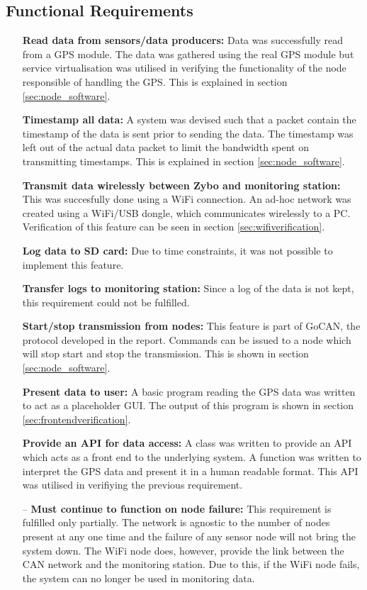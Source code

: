 \subsection{Functional Requirements}
\begin{itemize}
	\item[\cmark] \textbf{Read data from sensors/data producers:}
	Data was successfully read from a GPS module.
	The data was gathered using the real GPS module but service virtualisation was utilised in verifying the functionality of the node responsible of handling the GPS.
	This is explained in section \ref{sec:node_software}.
	\item[\cmark] \textbf{Timestamp all data:}
	A system was devised such that a packet contain the timestamp of the data is sent prior to sending the data.
	The timestamp was left out of the actual data packet to limit the bandwidth spent on transmitting timestamps.
	This is explained in section \ref{sec:node_software}.
	\item[\cmark] \textbf{Transmit data wirelessly between Zybo and monitoring station:}
	This was succesfully done using a WiFi connection.
	An ad-hoc network was created using a WiFi/USB dongle, which communicates wirelessly to a PC.
	Verification of this feature can be seen in section \ref{sec:wifiverification}.
	\item[\xmark] \textbf{Log data to SD card:}
	Due to time constraints, it was not possible to implement this feature.
	\item[\xmark] \textbf{Transfer logs to monitoring station:}
	Since a log of the data is not kept, this requirement could not be fulfilled.
	\item[\cmark] \textbf{Start/stop transmission from nodes:}
	This feature is part of GoCAN, the protocol developed in the report.
	Commands can be issued to a node which will stop start and stop the transmission.
	This is shown in section \ref{sec:node_software}.
	\item[\cmark] \textbf{Present data to user:}
	A basic program reading the GPS data was written to act as a placeholder GUI.
	The output of this program is shown in section \ref{sec:frontendverification}.
	\item[\cmark] \textbf{Provide an API for data access:}
	A class was written to provide an API which acts as a front end to the underlying system.
	A function was written to interpret the GPS data and present it in a human readable format.
	This API was utilised in verifiying the previous requirement.
	\item[--] \textbf{Must continue to function on node failure:}
	This requirement is fulfilled only partially. 
	The network is agnostic to the number of nodes present at any one time and the failure of any sensor node will not bring the system down.
	The WiFi node does, however, provide the link between the CAN network and the monitoring station.
	Due to this, if the WiFi node fails, the system can no longer be used in monitoring data.
\end{itemize}

